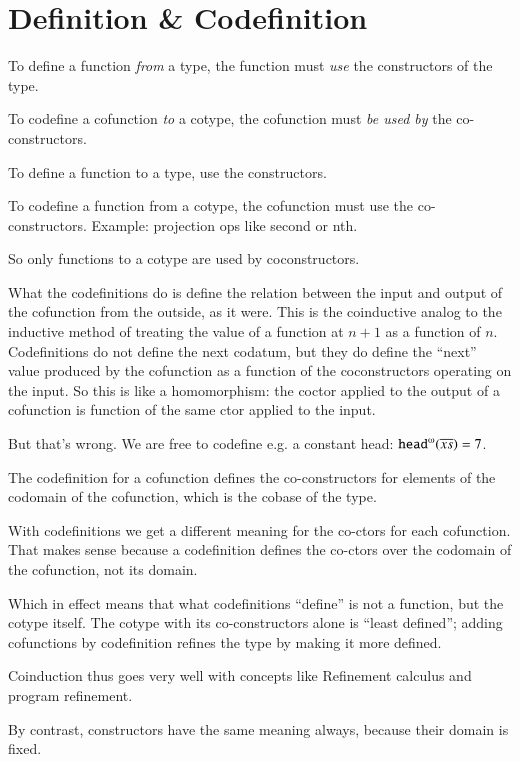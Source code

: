 \section{Definition \& Codefinition}\label{sec:definition}

To define a function \textit{from} a type, the function must
\textit{use} the constructors of the type.

To codefine a cofunction \textit{to} a cotype, the cofunction must
\textit{be used by} the co-constructors.

To define a function to a type, use the constructors.

To codefine a function from a cotype, the cofunction must use the
co-constructors. Example: projection ops like \textsf{second} or
\textsf{nth}.

So only functions to a cotype are used by coconstructors.

What the codefinitions do is define the relation between the input and
output of the cofunction from the outside, as it were. This is the
coinductive analog to the inductive method of treating the value of a
function at \(n+1\) as a function of \(n\). Codefinitions do not
define the next codatum, but they do define the ``next'' value
produced by the cofunction as a function of the coconstructors
operating on the input. So this is like a homomorphism: the coctor
applied to the output of a cofunction is function of the same ctor
applied to the input.

But that's wrong. We are free to codefine e.g. a constant head:
\mbox{\(\cohead(\coseq{x}) = 7\)}.

The codefinition for a cofunction defines the co-constructors for
elements of the codomain of the cofunction, which is the cobase of the
type.

With codefinitions we get a different meaning for the co-ctors for
each cofunction. That makes sense because a codefinition defines the
co-ctors over the codomain of the cofunction, not its domain.

Which in effect means that what codefinitions ``define'' is not a
function, but the cotype itself. The cotype with its co-constructors
alone is ``least defined''; adding cofunctions by codefinition refines
the type by making it more defined.

Coinduction thus goes very well with concepts like Refinement calculus
and program refinement.

By contrast, constructors have the same meaning always, because their
domain is fixed.

